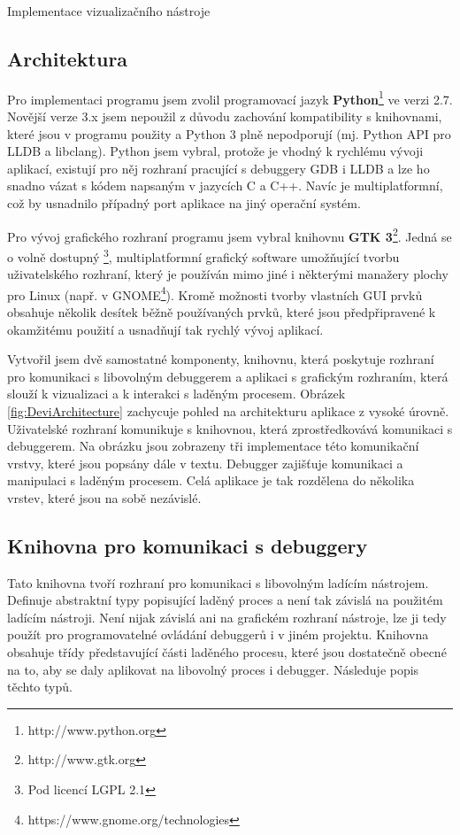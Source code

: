 \documentclass[czech,bachelor,male,python,dept460,hidelinks]{diploma}						%
\newcommand{\parspace}[1][]{
	\ifthenelse{\isempty{#1}}{\vspace{5mm}}{\vspace{#1}}
	\par
}
\begin{document}
\begin{section}{Implementace vizualizačního nástroje}
	\subsection{Architektura}
	\par Pro implementaci programu jsem zvolil programovací jazyk \textbf{Python}\footnote{http://www.python.org} ve verzi 2.7. Novější verze 3.x jsem nepoužil
	z důvodu zachování kompatibility s knihovnami, které jsou v programu použity a Python 3 plně nepodporují (mj. Python API pro LLDB a libclang).
	Python jsem vybral, protože je vhodný k rychlému vývoji aplikací, existují pro něj rozhraní pracující s debuggery GDB i LLDB a lze ho snadno vázat
	s kódem napsaným v jazycích C a C++. Navíc je multiplatformní, což by usnadnilo případný port aplikace na jiný operační systém.
	
	\parspace Pro vývoj grafického rozhraní programu jsem vybral knihovnu \textbf{GTK 3}\footnote{http://www.gtk.org}. Jedná se o volně dostupný
	\footnote{Pod licencí LGPL 2.1}, multiplatformní grafický software umožňující tvorbu uživatelského rozhraní, který je používán mimo jiné i
	některými manažery plochy pro Linux (např. v GNOME\footnote{https://www.gnome.org/technologies}). Kromě možnosti tvorby vlastních
	GUI prvků obsahuje několik desítek běžně používaných prvků, které jsou předpřipravené k okamžitému použití a usnadňují tak rychlý vývoj aplikací.
	
	\parspace Vytvořil jsem dvě samostatné komponenty, knihovnu, která poskytuje rozhraní pro komunikaci s libovolným debuggerem a aplikaci s grafickým rozhraním,
	která slouží k vizualizaci a k interakci s laděným procesem.
	Obrázek \ref{fig:DeviArchitecture} zachycuje pohled na architekturu aplikace z vysoké úrovně.
	Uživatelské rozhraní komunikuje s knihovnou, která zprostředkovává komunikaci s debuggerem. Na obrázku jsou zobrazeny tři implementace této komunikační vrstvy,
	které jsou popsány dále v textu. Debugger zajišťuje komunikaci a manipulaci s laděným procesem. Celá aplikace je tak rozdělena do několika
	vrstev, které jsou na sobě nezávislé.
	
		
	\subsection{Knihovna pro komunikaci s debuggery}
	\label{sec:DebuggerApi}
		Tato knihovna tvoří rozhraní pro komunikaci s libovolným ladícím nástrojem. Definuje abstraktní typy popisující laděný proces a není tak závislá na
		použitém ladícím nástroji. Není nijak závislá ani na grafickém rozhraní nástroje, lze ji tedy použít pro programovatelné ovládání debuggerů i v jiném
		projektu. Knihovna obsahuje třídy představující části laděného procesu, které jsou dostatečně obecné na to, aby se daly aplikovat na libovolný
		proces i debugger. Následuje popis těchto typů.
		

\end{section}
\end{document}
